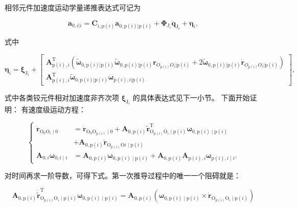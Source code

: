 相邻元件加速度运动学量递推表达式可记为

\[
\boldsymbol{a}_{0,i|i} = \boldsymbol{C}_{i,\mathrm{p}(i)} \boldsymbol{a}_{0,\mathrm{p}(i)|\mathrm{p}(i)} + \boldsymbol{\Phi}_{\mathrm{J}_i} \ddot{\boldsymbol{q}}_{\mathrm{J}_i} + \boldsymbol{\eta}_i,
\]

式中

\[
\boldsymbol{\eta}_i = \boldsymbol{\xi}_{\mathrm{J}_i} + \begin{bmatrix} \boldsymbol{A}_{\mathrm{p}(i),i}^{\mathrm{T}} \left( \tilde{\boldsymbol{\omega}}_{0,\mathrm{p}(i)|\mathrm{p}(i)} \tilde{\boldsymbol{\omega}}_{0,\mathrm{p}(i)|\mathrm{p}(i)} \boldsymbol{r}_{O_{\mathrm{p}(i)} O_i|\mathrm{p}(i)} + 2 \tilde{\boldsymbol{\omega}}_{0,\mathrm{p}(i)|\mathrm{p}(i)} \dot{\boldsymbol{r}}_{O_{\mathrm{p}(i)} O_i|\mathrm{p}(i)} \right) \\ \boldsymbol{A}_{\mathrm{p}(i),i}^{\mathrm{T}} \tilde{\boldsymbol{\omega}}_{0,\mathrm{p}(i)|\mathrm{p}(i)} \boldsymbol{\omega}_{\mathrm{p}(i),i|\mathrm{p}(i)} \end{bmatrix},
\]

式中各类铰元件相对加速度非齐次项 $\boldsymbol{\xi}_{\mathrm{J}_i}$ 的具体表达式见下一小节。
下面开始证明： 有速度级运动方程：

\[
\left\{\begin{aligned}
\dot{\boldsymbol{r}}_{\mathrm{O}_{0} \mathrm{O}_{i} \mid 0} & =\dot{\boldsymbol{r}}_{\mathrm{O}_{0} \mathrm{O}_{\mathrm{p}(i)} \mid 0}+
\boldsymbol{A}_{0, \mathrm{p}(i)} \tilde{\boldsymbol{r}}^{\mathrm{T}}_{\mathrm{O}_{\mathrm{p}(i)} \mathrm{O}_{i} \mid \mathrm{p}(i)} \boldsymbol{\omega}_{0, \mathrm{p}(i) \mid \mathrm{p}(i)} \\
& +\boldsymbol{A}_{0, \mathrm{p}(i)} \dot{\boldsymbol{r}}_{\mathrm{O}_{\mathrm{p}(i)} \mathrm{O} i \mid \mathrm{p}(i)} \\
\boldsymbol{A}_{0, i} \boldsymbol{\omega}_{0, i \mid i} & =\boldsymbol{A}_{0, \mathrm{p}(i)} \boldsymbol{\omega}_{0, \mathrm{p}(i) \mid \mathrm{p}(i)}+\boldsymbol{A}_{0, \mathrm{p}(i)} \boldsymbol{A}_{\mathrm{p}(i), i} \boldsymbol{\omega}_{\mathrm{p}(i), i \mid i} .
\end{aligned}\right.
\]

对时间再求一阶导数，可得下式。第一次推导过程中的唯一一个阻碍就是：

\[
\boldsymbol{A}_{0, \mathrm{p}(i)}\dot{\tilde{\boldsymbol{r}}}^{\mathrm{T}}_{\mathrm{O}_{\mathrm{p}(i)} \mathrm{O}_{i} \mid \mathrm{p}(i)} \boldsymbol{\omega}_{0, \mathrm{p}(i) \mid \mathrm{p}(i)} =\boldsymbol{A}_{0, \mathrm{p}(i)}(\boldsymbol{\omega}_{0, \mathrm{p}(i) \mid \mathrm{p}(i)}\times \dot{\boldsymbol{r}}_{\mathrm{O}_{\mathrm{p}(i)} \mathrm{O}_{i} \mid \mathrm{p}(i)})
\]

